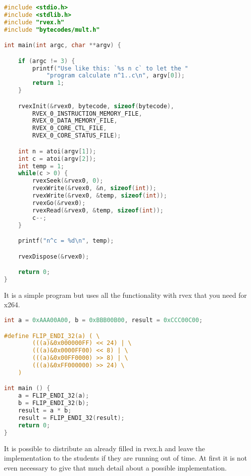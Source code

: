 \begin{lstlisting}[language=C,style=C,caption=pow - Microblaze part,label=lst:pow-microblaze]
#include <stdio.h>
#include <stdlib.h>
#include "rvex.h"
#include "bytecodes/mult.h"

int main(int argc, char **argv) {

	if (argc != 3) {
		printf("Use like this: `%s n c` to let the "
			"program calculate n^1..c\n", argv[0]);
		return 1;
	}

	rvexInit(&rvex0, bytecode, sizeof(bytecode),
		RVEX_0_INSTRUCTION_MEMORY_FILE,
		RVEX_0_DATA_MEMORY_FILE,
		RVEX_0_CORE_CTL_FILE,
		RVEX_0_CORE_STATUS_FILE);

	int n = atoi(argv[1]);
	int c = atoi(argv[2]);
	int temp = 1;
	while(c > 0) {
		rvexSeek(&rvex0, 0);
		rvexWrite(&rvex0, &n, sizeof(int));
		rvexWrite(&rvex0, &temp, sizeof(int));
		rvexGo(&rvex0);
		rvexRead(&rvex0, &temp, sizeof(int));
		c--;
	}

	printf("n^c = %d\n", temp);

	rvexDispose(&rvex0);

	return 0;
}
\end{lstlisting}

It is a simple program but uses all the functionality with rvex that you need for x264.

\begin{lstlisting}[language=C,style=C,caption=pow - kernel part,label=lst:pow-kernel]
int a = 0xAAA00A00, b = 0xBBB00B00, result = 0xCCC00C00;

#define FLIP_ENDI_32(a) ( \
		(((a)&0x000000FF) << 24) | \
		(((a)&0x0000FF00) << 8) | \
		(((a)&0x00FF0000) >> 8) | \
		(((a)&0xFF000000) >> 24) \
	)

int main () {
	a = FLIP_ENDI_32(a);
	b = FLIP_ENDI_32(b);
	result = a * b;
	result = FLIP_ENDI_32(result);
	return 0;
}
\end{lstlisting}

It is possible to distribute an already filled in rvex.h and leave the implementation to the students if they are running out of time.
At first it is not even necessary to give that much detail about a possible implementation.
